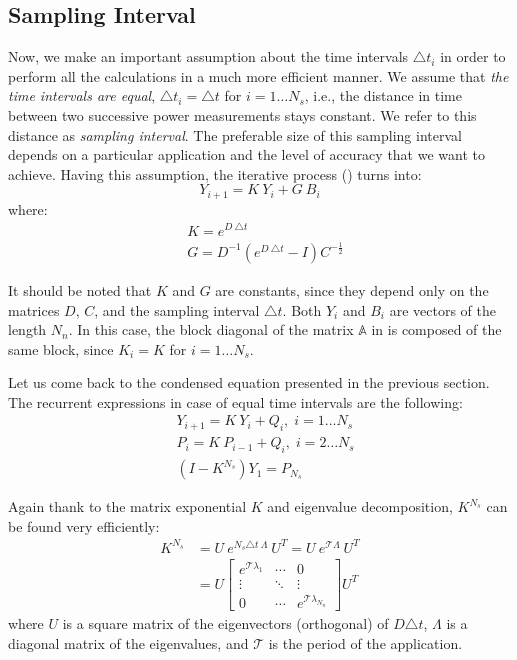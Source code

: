 \subsection{Sampling Interval}
Now, we make an important assumption about the time intervals $\triangle t_i$ in order to perform all the calculations in a much more efficient manner. We assume that \emph{the time intervals are equal}, $\triangle t_i = \triangle t$ for $i = 1 \dots N_s$, i.e., the distance in time between two successive power measurements stays constant. We refer to this distance as \emph{sampling interval}. The preferable size of this sampling interval depends on a particular application and the level of accuracy that we want to achieve. Having this assumption, the iterative process () turns into:
\[
  Y_{i+1} = K \: Y_i + G \: B_i
\]
where:
\begin{align*}
  & K = e^{D \: \triangle t} \\
  & G = D^{-1} \left( e^{D \: \triangle t} - I \right) C^{-\frac{1}{2}}
\end{align*}

It should be noted that $K$ and $G$ are constants, since they depend only on the matrices $D$, $C$, and the sampling interval $\triangle t$. Both $Y_i$ and $B_i$ are vectors of the length $N_n$. In this case, the block diagonal of the matrix $\mathbb{A}$ in  is composed of the same block, since $K_i = K$ for $i = 1 \dots N_s$.

Let us come back to the condensed equation presented in the previous section. The recurrent expressions in case of equal time intervals are the following:
\begin{align}
  & Y_{i + 1} = K \: Y_i + Q_i, \; i = 1 \dots N_s \nonumber \\
  & P_i = K \: P_{i - 1} + Q_i, \; i = 2 \dots N_s \nonumber \\
  & (I - K^{N_s}) Y_1 = P_{N_s} \label{eq:linear-system}
\end{align}

Again thank to the matrix exponential $K$ and eigenvalue decomposition, $K^{N_s}$ can be found very efficiently:
\begin{align*}
  K^{N_s} & = U \: e^{N_s \triangle t \: \Lambda} \: U^T = U \: e^{\mathcal{T} \Lambda} \: U^T \\
    & = U \left[
      \begin{array}{ccc}
        e^{\mathcal{T} \lambda_1} & \cdots & 0 \\
        \vdots & \ddots & \vdots \\
        0 & \cdots & e^{\mathcal{T} \lambda_{N_n}}
      \end{array}
    \right] U^T
\end{align*}
where $U$ is a square matrix of the eigenvectors (orthogonal) of $D \triangle t$, $\Lambda$ is a diagonal matrix of the eigenvalues, and $\mathcal{T}$ is the period of the application.

